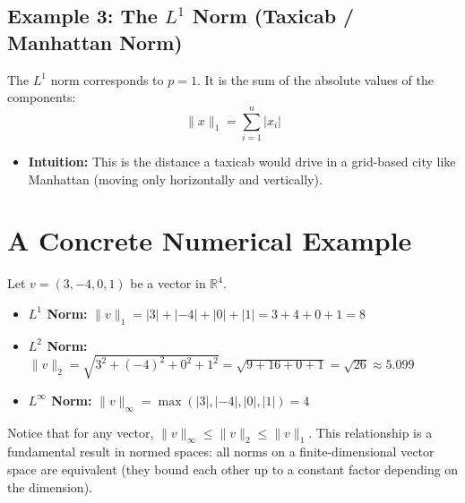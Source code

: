 \documentclass[11pt]{article}
\begin{document}
\subsection{Example 3: The \(L^1\) Norm (Taxicab / Manhattan Norm)}

The \(L^1\) norm corresponds to \(p=1\). It is the sum of the absolute
values of the components:
\[
  \|x\|_1 = \sum_{i=1}^n |x_i|
\]

\begin{itemize}
  \item \textbf{Intuition:} This is the distance a taxicab would drive
        in a grid-based city like Manhattan (moving only horizontally
        and vertically).
\end{itemize}

\hrulefill

\section{A Concrete Numerical Example}

Let \(v = (3, -4, 0, 1)\) be a vector in \(\mathbb{R}^4\).

\begin{itemize}
  \item \textbf{\(L^1\) Norm:}
        \(\|v\|_1 = |3| + |-4| + |0| + |1| = 3 + 4 + 0 + 1 = 8\)
  \item \textbf{\(L^2\) Norm:}
        \(\|v\|_2 = \sqrt{3^2 + (-4)^2 + 0^2 + 1^2}
                  = \sqrt{9 + 16 + 0 + 1}
                  = \sqrt{26} \approx 5.099\)
  \item \textbf{\(L^\infty\) Norm:}
        \(\|v\|_\infty = \max(|3|, |-4|, |0|, |1|) = 4\)
\end{itemize}

Notice that for any vector,
\(\|v\|_\infty \le \|v\|_2 \le \|v\|_1\). This relationship is a
fundamental result in normed spaces: all norms on a finite-dimensional
vector space are equivalent (they bound each other up to a constant
factor depending on the dimension).
\end{document}

